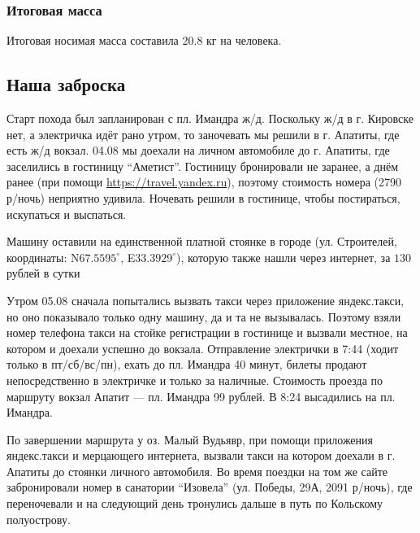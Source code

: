 \subsubsection{Итоговая масса}
Итоговая носимая масса составила 20.8 кг на человека.

\subsection{Наша заброска}
Старт похода был запланирован с пл. Имандра ж/д. Поскольку ж/д в г. Кировске нет, а электричка идёт рано утром,
то заночевать мы решили в г. Апатиты, где есть ж/д вокзал. 04.08 мы доехали на личном автомобиле до г. Апатиты,
где заселились в гостиницу \enquote{Аметист}. Гостиницу бронировали не заранее, а днём ранее
(при помощи \textenglish{\url{https://travel.yandex.ru}}), поэтому стоимость номера (2790 р/ночь) неприятно удивила.
Ночевать решили в гостинице, чтобы постираться, искупаться и выспаться.

Машину оставили на единственной платной стоянке в городе (ул. Строителей, координаты:
N$67.5595^{\circ}$, E$33.3929^{\circ}$),
которую также нашли через интернет, за $130$ рублей в сутки

Утром 05.08 сначала попытались вызвать такси через приложение яндекс.такси, но оно показывало только одну машину,
да и та не вызывалась. Поэтому взяли номер телефона такси на стойке регистрации в гостинице и вызвали местное,
на котором и доехали успешно до вокзала. Отправление электрички в 7:44 (ходит только в пт/сб/вс/пн),
ехать до пл. Имандра 40 минут, билеты продают непосредственно в электричке и только за наличные.
Стоимость проезда по маршруту вокзал Апатит --- пл. Имандра 99 рублей. В 8:24 высадились на пл. Имандра.

По завершении маршрута у оз. Малый Вудьявр, при помощи приложения яндекс.такси и мерцающего интернета,
вызвали такси на котором доехали в г. Апатиты до стоянки личного автомобиля.
Во время поездки на том же сайте забронировали номер в санатории \enquote{Изовела} (ул. Победы, 29А, 2091 р/ночь),
где переночевали и на следующий день тронулись дальше в путь по Кольскому полуострову.
